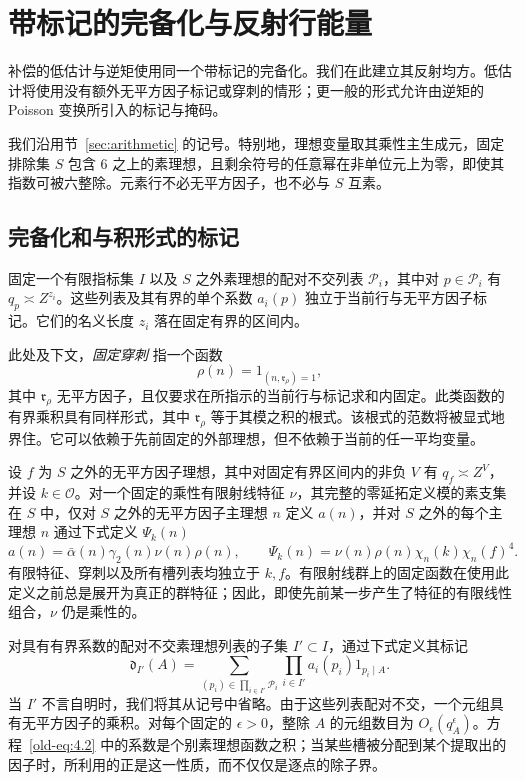 \section{带标记的完备化与反射行能量}
\label{sec:marked}\label{sec:marked-energy}

补偿的低估计与逆矩使用同一个带标记的完备化。我们在此建立其反射均方。低估计将使用没有额外无平方因子标记或穿刺的情形；更一般的形式允许由逆矩的 Poisson 变换所引入的标记与掩码。

我们沿用节~\ref{sec:arithmetic} 的记号。特别地，理想变量取其乘性主生成元，固定排除集 \(S\) 包含 \(6\) 之上的素理想，且剩余符号的任意幂在非单位元上为零，即使其指数可被六整除。元素行不必无平方因子，也不必与 \(S\) 互素。

\subsection{完备化和与积形式的标记}

固定一个有限指标集 \(I\) 以及 \(S\) 之外素理想的配对不交列表 \(\mathcal P_i\)，其中对 \(p\in\mathcal P_i\) 有 \(q_p\asymp Z^{z_i}\)。这些列表及其有界的单个系数 \(a_i(p)\) 独立于当前行与无平方因子标记。它们的名义长度 \(z_i\) 落在固定有界的区间内。

此处及下文，\emph{固定穿刺} 指一个函数
\[
 \rho(n)=1_{(n,\mathfrak r_\rho)=1},
\]
其中 \(\mathfrak r_\rho\) 无平方因子，且仅要求在所指示的当前行与标记求和内固定。此类函数的有界乘积具有同样形式，其中 \(\mathfrak r_\rho\) 等于其模之积的根式。该根式的范数将被显式地界住。它可以依赖于先前固定的外部理想，但不依赖于当前的任一平均变量。

设 \(f\) 为 \(S\) 之外的无平方因子理想，其中对固定有界区间内的非负 \(V\) 有 \(q_f\asymp Z^V\)，并设 \(k\in\mathcal O\)。对一个固定的乘性有限射线特征 \(\nu\)，其完整的零延拓定义模的素支集在 \(S\) 中，仅对 \(S\) 之外的无平方因子主理想 \(n\) 定义 \(a(n)\)，并对 \(S\) 之外的每个主理想 \(n\) 通过下式定义 \(\Psi_k(n)\)
\[
 a(n)=\bar\alpha(n)\gamma_2(n)\nu(n)\rho(n),\qquad
 \Psi_k(n)=\nu(n)\rho(n)\chi_n(k)\chi_n(f)^4.
\]
有限特征、穿刺以及所有槽列表均独立于 \(k,f\)。有限射线群上的固定函数在使用此定义之前总是展开为真正的群特征；因此，即使先前某一步产生了特征的有限线性组合，\(\nu\) 仍是乘性的。

对具有有界系数的配对不交素理想列表的子集 \(I'\subset I\)，通过下式定义其标记
\begin{equation}\label{old-eq:4.2}
 \mathfrak d_{I'}(A)=
 \sum_{(p_i)\in\prod_{i\in I'}\mathcal P_i}
      \prod_{i\in I'}a_i(p_i)1_{p_i\mid A}.
\end{equation}
当 \(I'\) 不言自明时，我们将其从记号中省略。由于这些列表配对不交，一个元组具有无平方因子的乘积。对每个固定的 \(\epsilon>0\)，整除 \(A\) 的元组数目为 \(O_\epsilon(q_A^\epsilon)\)。方程~\eqref{old-eq:4.2} 中的系数是个别素理想函数之积；当某些槽被分配到某个提取出的因子时，所利用的正是这一性质，而不仅仅是逐点的除子界。

